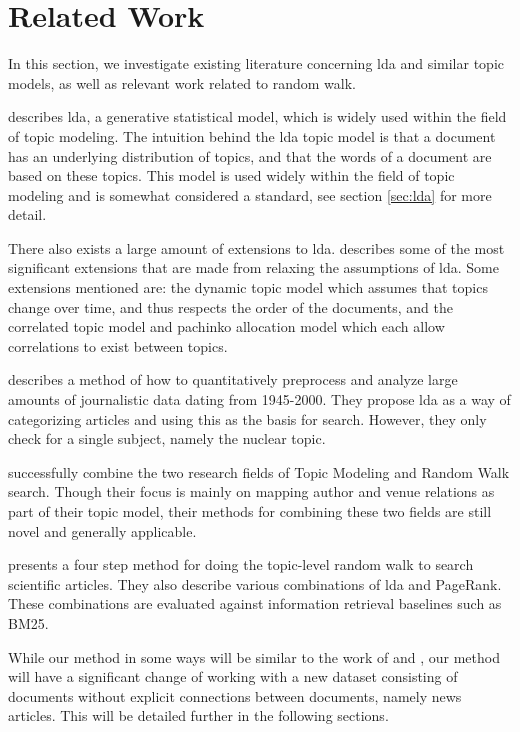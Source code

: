 \section{Related Work}\label{sec:related-works} 
In this section, we investigate existing literature concerning \gls{lda} and similar topic models, as well as relevant work related to random walk.

\citet{lda} describes \acrlong{lda}, a generative statistical model, which is widely used within the field of topic modeling. 
The intuition behind the \gls{lda} topic model is that a document has an underlying distribution of topics, and that the words of a document are based on these topics.
This model is used widely within the field of topic modeling and is somewhat considered a standard, see section \autoref{sec:lda} for more detail.

There also exists a large amount of extensions to \gls{lda}.
\citet{blei2012topicmodels} describes some of the most significant extensions that are made from relaxing the assumptions of \gls{lda}.
Some extensions mentioned are: the dynamic topic model\cite{blei2006dynamic} which assumes that topics change over time, and thus respects the order of the documents, and the correlated topic model\cite{blei2007correlated} and pachinko allocation model\cite{li2006pachinko} which each allow correlations to exist between topics.


\citet{quanti} describes a method of how to quantitatively preprocess and analyze large amounts of journalistic data dating from 1945-2000. 
They propose \gls{lda} as a way of categorizing articles and using this as the basis for search.
However, they only check for a single subject, namely the nuclear topic.  


\citet{Tang2008} successfully combine the two research fields of Topic Modeling and Random Walk search. 
Though their focus is mainly on mapping author and venue relations as part of their topic model, their methods for combining these two fields are still novel and generally applicable.


\citet{yang2009topic} presents a four step method for doing the topic-level random walk to search scientific articles. 
They also describe various combinations of \gls{lda} and PageRank.
These combinations are evaluated against information retrieval baselines such as BM25\cite{bm251996}.


While our method in some ways will be similar to the work of \citeauthor{Tang2008} and \citeauthor{yang2009topic}, our method will have a significant change of working with a new dataset consisting of documents without explicit connections between documents, namely news articles.
This will be detailed further in the following sections.

